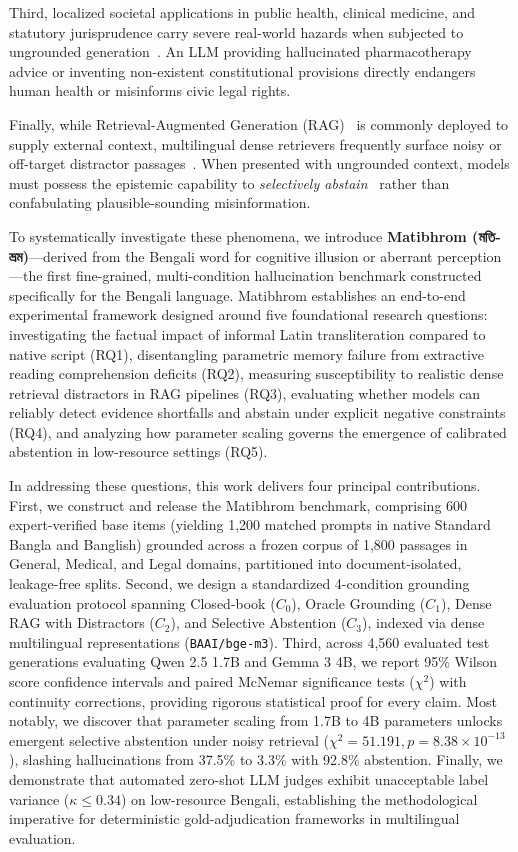 Third, localized societal applications in public health, clinical medicine, and statutory jurisprudence carry severe real-world hazards when subjected to ungrounded generation~\citep{pal2023medhalt,guha2023legalbench}. An LLM providing hallucinated pharmacotherapy advice or inventing non-existent constitutional provisions directly endangers human health or misinforms civic legal rights.

Finally, while Retrieval-Augmented Generation (RAG)~\citep{lewis2020rag} is commonly deployed to supply external context, multilingual dense retrievers frequently surface noisy or off-target distractor passages~\citep{cuconasu2024power,park2024robust}. When presented with ungrounded context, models must possess the epistemic capability to \emph{selectively abstain}~\citep{cole2023selectively,yin2023large} rather than confabulating plausible-sounding misinformation.

To systematically investigate these phenomena, we introduce \textbf{Matibhrom (\foreignlanguage{bengali}{মতিভ্রম})}---derived from the Bengali word for cognitive illusion or aberrant perception---the first fine-grained, multi-condition hallucination benchmark constructed specifically for the Bengali language. Matibhrom establishes an end-to-end experimental framework designed around five foundational research questions: investigating the factual impact of informal Latin transliteration compared to native script (RQ1), disentangling parametric memory failure from extractive reading comprehension deficits (RQ2), measuring susceptibility to realistic dense retrieval distractors in RAG pipelines (RQ3), evaluating whether models can reliably detect evidence shortfalls and abstain under explicit negative constraints (RQ4), and analyzing how parameter scaling governs the emergence of calibrated abstention in low-resource settings (RQ5).

In addressing these questions, this work delivers four principal contributions. First, we construct and release the Matibhrom benchmark, comprising 600 expert-verified base items (yielding 1,200 matched prompts in native Standard Bangla and Banglish) grounded across a frozen corpus of 1,800 passages in General, Medical, and Legal domains, partitioned into document-isolated, leakage-free splits. Second, we design a standardized 4-condition grounding evaluation protocol spanning Closed-book ($C_0$), Oracle Grounding ($C_1$), Dense RAG with Distractors ($C_2$), and Selective Abstention ($C_3$), indexed via dense multilingual representations (\texttt{BAAI/bge-m3}). Third, across 4,560 evaluated test generations evaluating Qwen 2.5 1.7B and Gemma 3 4B, we report 95\% Wilson score confidence intervals and paired McNemar significance tests ($\chi^2$) with continuity corrections, providing rigorous statistical proof for every claim. Most notably, we discover that parameter scaling from 1.7B to 4B parameters unlocks emergent selective abstention under noisy retrieval ($\chi^2 = 51.191, p = 8.38 \times 10^{-13}$), slashing hallucinations from 37.5\% to 3.3\% with 92.8\% abstention. Finally, we demonstrate that automated zero-shot LLM judges exhibit unacceptable label variance ($\kappa \le 0.34$) on low-resource Bengali, establishing the methodological imperative for deterministic gold-adjudication frameworks in multilingual evaluation.
